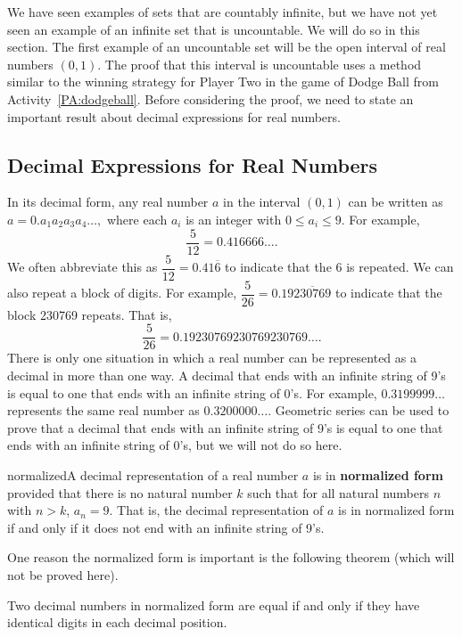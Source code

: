 We have seen examples of sets that are countably infinite, but we have not yet seen an example of an infinite set that is uncountable.  We will do so in this section.  The first example of an uncountable set will be the open interval of real numbers $( 0, 1 )$.  The proof that this interval is uncountable uses a method similar to the winning strategy for Player Two in the game of Dodge Ball from \typeu Activity~\ref*{PA:dodgeball}.  Before considering the proof, we need to state an important result about decimal expressions for real numbers.

\subsection*{Decimal Expressions for Real Numbers}
%

In its decimal form, any real number $a$ in the interval $( 0, 1 )$ can be written as
$a = 0.a_1 a_2 a_3 a_4 \ldots ,$ where each $a_i$ is an integer with $0 \leq a_i \leq 9$.  For example,
\[
\frac{5}{12} = 0.416666 \ldots.
\]
We often abbreviate this as $\dfrac{5}{12} = 0.41 \overline{6}$ to indicate that the $6$ is repeated.  We can also repeat a block of digits.  For example, 
$\dfrac{5}{26} = 0.19 \overline{230769}$ to indicate that the block 230769 repeats.  That is, 
\[
\frac{5}{26} = 0.19230769230769230769 \ldots.
\]
There is only one situation in which a real number can be represented as a decimal in more than one way.  A decimal that ends with an infinite string of 9's is equal to one that ends with an infinite string of 0's.  For example, $0.3199999 \ldots$ represents the same real number as 
$0.3200000 \ldots .$  Geometric series can be used to prove that a decimal that ends with an infinite string of 9's is equal to one that ends with an infinite string of 0's, but we will not do so here.

\begin{defbox}{normalized}{A decimal representation of a real number $a$ is in \textbf{normalized form}
%
%
\label{normalizedform}%
 provided that there is no natural number $k$ such that for all natural numbers $n$ with $n > k$, $a_n = 9$.  That is, the decimal representation of $a$ is in normalized form if and only if it does not end with an infinite string of 9's.}
\end{defbox}

\newpar
One reason the normalized form is important is the following theorem (which will not be proved here).
\begin{theorem} \label{T:normalized} Two decimal numbers in normalized form are equal if and only if they have identical digits in each decimal position.
\end{theorem}

\endinput
